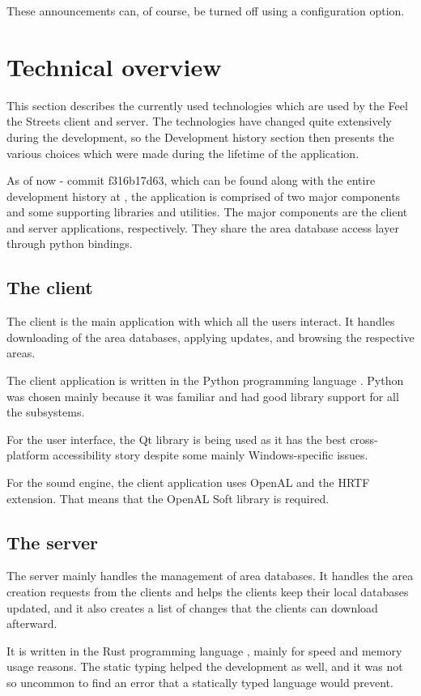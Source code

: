 \documentclass[nolof,digital]{fithesis3}
\begin{document}
These announcements can, of course, be turned off using a configuration option.
\section{Technical overview}
This section describes the currently used technologies which are used by the Feel the Streets client and server. The technologies have changed quite extensively during the development, so the Development history section then presents the various choices which were made during the lifetime of the application.

As of now - commit f316b17d63, which can be found along with the entire development history at \parencite{fts_repo}, the application is comprised of two major components and some supporting libraries and utilities. The major components are the client and server applications, respectively. They share the area database access layer through python bindings.
\subsection{The client}
The client is the main application with which all the users interact. It handles downloading of the area databases, applying updates, and browsing the respective areas.

The client application is written in the Python programming language \parencite{python}. Python was chosen mainly because it was familiar and had good library support for all the subsystems.

For the user interface, the Qt library \parencite{qt} is being used as it has the best cross-platform accessibility story despite some mainly Windows-specific issues.

For the sound engine, the client application uses OpenAL and the HRTF extension. That means that the OpenAL Soft library \parencite{openalsoft} is required.
\subsection{The server}
The server mainly handles the management of area databases. It handles the area creation requests from the clients and helps the clients keep their local databases updated, and it also creates a list of changes that the clients can download afterward.

It is written in the Rust programming language \parencite{rust}, mainly for speed and memory usage reasons. The static typing helped the development as well, and it was not so uncommon to find an error that a statically typed language would prevent.
\end{document}
